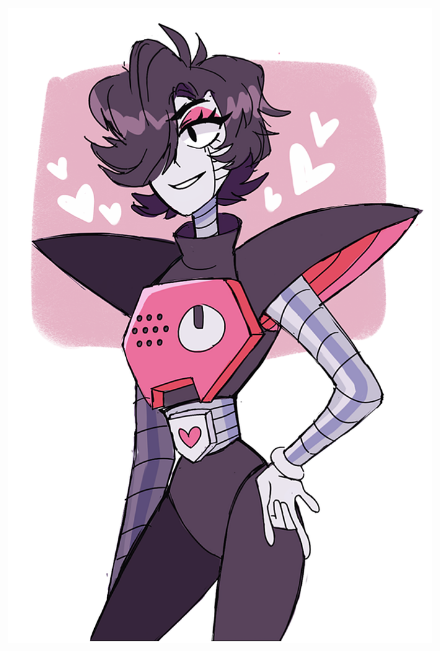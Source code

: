 \begin{figure}
\centering
\includegraphics[scale=0.50]{MettatonEX.png}
\end{figure}

























